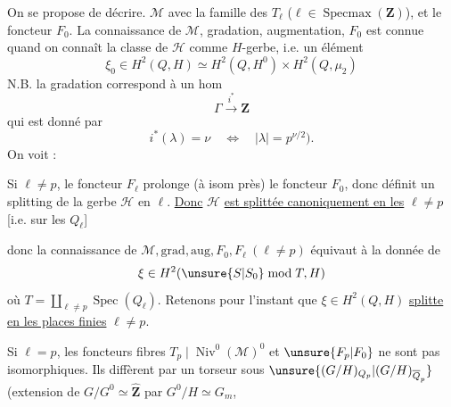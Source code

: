 On se propose de décrire.  $\mathcal M$  avec la famille des $T_\ell$ ($\ell\in\operatorname{Specmax}(\mathbf Z)$),  et le foncteur $F_0$. La connaissance de $\mathcal M$, gradation, augmentation, $F_0$ est connue quand on connaît la classe de $\mathcal H$ comme $H$-gerbe, i.e. un élément
\[
\xi_0\in H^2(Q,H)\simeq H^2(Q,H^0)\times H^2(Q,\mu_2)
\]
N.B. la gradation correspond à un hom
\[
\Gamma\xrightarrow{i^*}\mathbf Z
\]
qui est donné par
\[
i^*(\lambda)=\nu\quad\Longleftrightarrow\quad |\lambda|=p^{\nu/2}).
\]
On voit :

Si $\ell\ne p$, le foncteur $F_\ell$ prolonge (à isom près) le foncteur $F_0$, donc  définit un splitting de la gerbe $\mathcal H$  en $\ell$. \uline{Donc} $\mathcal H$ \uline{est splittée canoniquement en les} $\ell\ne p$ [i.e. sur les $Q_\ell$]

donc la connaissance de  $\mathcal M,\mathrm{grad},\mathrm{aug},F_0,F_\ell\ (\ell\ne p)$ équivaut à la donnée de
\[
\xi\in H^2(\unsure{S|S_0}\bmod T,H)
\]
où $T=\coprod_{\ell\ne p}\operatorname{Spec}(Q_\ell)$. Retenons pour l'instant que $\xi\in H^2(Q,H)$ \uline{splitte en les places finies} $\ell\ne p$.

Si $\ell=p$, les foncteurs fibres $T_p\!\mid\!\operatorname{Niv}^0(\mathcal M)^0$ et $\unsure{F_p|F_0}$ ne sont pas isomorphiques. Ils diffèrent par un torseur sous $\unsure{(G/H)_{Q_p}|(G/H)_{\overline Q_p}}$ (extension de $G/G^0\simeq\widehat{\mathbf Z}$ par $G^0/H\simeq G_m$,
